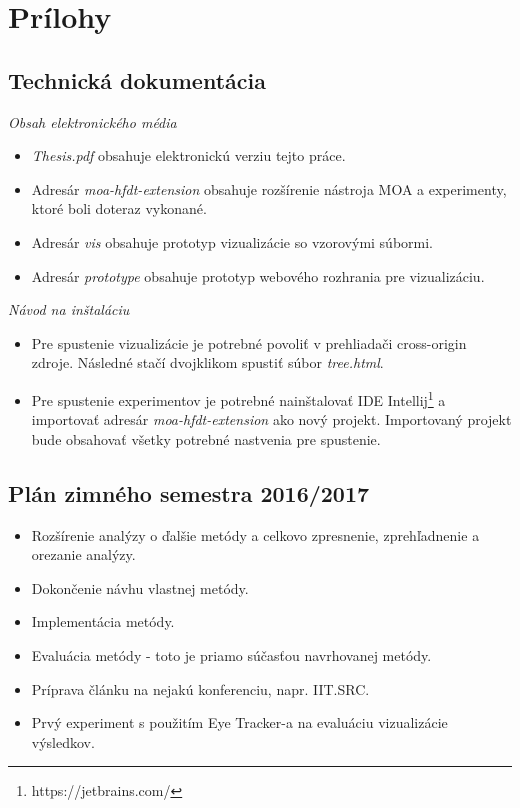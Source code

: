 \label{app.01}
\appendix
\chapter*{Prílohy}
\renewcommand{\thesection}{\Alph{section}}

\section{Technická dokumentácia}\label{tech-doku}
\textit{Obsah elektronického média}
\begin{itemize}
	\item \textit{Thesis.pdf} obsahuje elektronickú verziu tejto práce.
	\item Adresár \textit{moa-hfdt-extension} obsahuje rozšírenie nástroja MOA a experimenty, ktoré boli doteraz vykonané.
	\item Adresár \textit{vis} obsahuje prototyp vizualizácie so vzorovými súbormi.
	\item Adresár \textit{prototype} obsahuje prototyp webového rozhrania pre vizualizáciu.
\end{itemize}

\textit{Návod na inštaláciu}
\begin{itemize}
	\item Pre spustenie vizualizácie je potrebné povoliť v prehliadači cross-origin zdroje. Následné stačí dvojklikom spustiť súbor \textit{tree.html}.
	\item Pre spustenie experimentov je potrebné nainštalovať IDE Intellij\footnote{https://jetbrains.com/} a importovať adresár \textit{moa-hfdt-extension} ako nový projekt. Importovaný projekt bude obsahovať všetky potrebné nastvenia pre spustenie.
\end{itemize}



\newpage
\section{Plán zimného semestra 2016/2017}\label{plan-zima}
\begin{itemize}
	\item Rozšírenie analýzy o ďalšie metódy a celkovo zpresnenie, zprehľadnenie a orezanie analýzy.
	\item Dokončenie návhu vlastnej metódy.
	\item Implementácia metódy.
	\item Evaluácia metódy - toto je priamo súčasťou navrhovanej metódy.
	\item Príprava článku na nejakú konferenciu, napr. IIT.SRC.
	\item Prvý experiment s použitím Eye Tracker-a na evaluáciu vizualizácie výsledkov.
\end{itemize}

